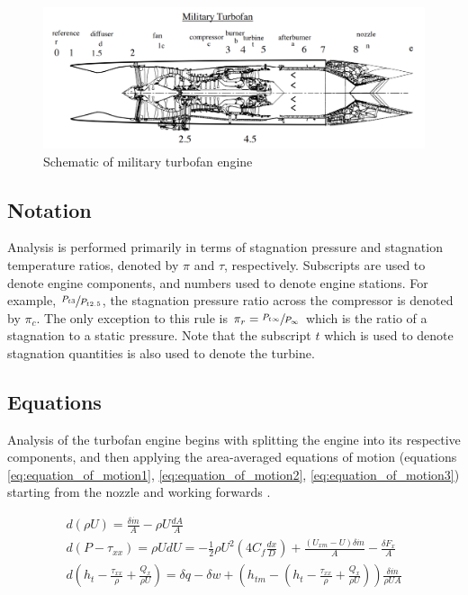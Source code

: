 \documentclass{article}
\begin{document}
\begin{figure}
\caption{Schematic of military turbofan engine \cite{cantwell283}}
\label{fig:turbofan_schematic}
\begin{center}
\includegraphics[scale=0.4]{figs/Military_Turbofan_Schematic_Cantwell.png}
\end{center}
\end{figure}

\subsection{Notation}
Analysis is performed primarily in terms of stagnation pressure and stagnation temperature ratios, denoted by $\pi$ and $\tau$, respectively. Subscripts are used to denote engine components, and numbers used to denote engine stations. For example, $\sfrac{P_{t3}}{P_{t2.5}}$, the stagnation pressure ratio across the compressor is denoted by $\pi_c$. The only exception to this rule is $\pi_r = \sfrac	{P_{t\infty}}{P_{\infty}}$ which is the ratio of a stagnation to a static pressure. Note that the subscript $t$ which is used to denote stagnation quantities is also used to denote the turbine.

\subsection{Equations}

Analysis of the turbofan engine begins with splitting the engine into its respective components, and then applying the area-averaged equations of motion (equations \ref{eq:equation_of_motion1}, \ref{eq:equation_of_motion2}, \ref{eq:equation_of_motion3}) starting from the nozzle and working forwards \cite{cantwell283}. 

\begin{gather}
\label{eq:equation_of_motion1}
d(\rho U) = \frac{\delta \dot{m}}{A} - \rho U \frac{dA}{A} \\
\label{eq:equation_of_motion2}
d(P - \tau_{xx}) = \rho U dU = - \frac{1}{2} \rho U^2 \left( 4 C_f \frac{dx}{D} \right) + \frac{(U_{xm} - U) \delta \dot{m}}{A} - \frac{\delta F_x}{A} \\
\label{eq:equation_of_motion3}
d \left( h_t - \frac{\tau_{xx}}{\rho} + \frac{Q_x}{\rho U} \right) = \delta q - \delta w + \left( h_{tm} - \left	( h_t - \frac{\tau_{xx}}{\rho} + \frac{Q_x}{\rho U} \right) \right) \frac{\delta \dot{m}}{\rho U A}
\end{gather}
\end{document}
